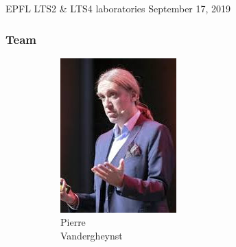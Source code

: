 \documentclass[aspectratio=169]{beamer}
\begin{document}
\begin{frame}[plain]
\begin{center}
		\vspace{0.4cm}
		{\footnotesize EPFL LTS2 \& LTS4 laboratories
		\hfill September 17, 2019}

	\end{center}
\end{frame}


\begin{frame}
	\frametitle{Team}
	\begin{figure}
		\centering
		\captionsetup{justification=centering}
		\begin{subfigure}[b]{0.14\linewidth}
			\includegraphics[width=\linewidth]{picture_pierre}
			\caption*{Pierre\\Vandergheynst}
		\end{subfigure}
		\hfill
		\begin{subfigure}[b]{0.14\linewidth}

\end{subfigure}
\end{figure}
\end{frame}
\end{document}
